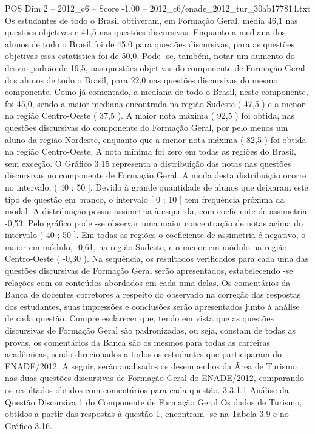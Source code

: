\begin{textsample}{POS Dim 2 – 2012\_c6 – Score -1.00 – 2012\_c6/enade\_2012\_tur\_30ab177814.txt}
Os estudantes de todo o Brasil obtiveram, em Formação Geral, média 46,1 nas questões objetivas e 41,5 nas questões discursivas.
Enquanto a mediana dos alunos de todo o Brasil foi de 45,0 para questões discursivas, para as questões objetivas essa estatística foi de 50,0.
Pode -se, também, notar um aumento do desvio padrão de 19,5, nas questões objetivas do componente de Formação Geral dos alunos de todo o Brasil, para 22,0 nas questões discursivas do mesmo componente.
Como já comentado, a mediana de todo o Brasil, neste componente, foi 45,0, sendo a maior mediana encontrada na região Sudeste ( 47,5 ) e a menor na região Centro-Oeste ( 37,5 ).
A maior nota máxima ( 92,5 ) foi obtida, nas questões discursivas do componente do Formação Geral, por pelo menos um aluno da região Nordeste, enquanto que a menor nota máxima ( 82,5 ) foi obtida na região Centro-Oeste.
A nota mínima foi zero em todas as regiões do Brasil, sem exceção.
O Gráfico 3.15 representa a distribuição das notas nas questões discursivas no componente de Formação Geral.
A moda desta distribuição ocorre no intervalo, ( 40 ; 50 ].
Devido à grande quantidade de alunos que deixaram este tipo de questão em branco, o intervalo [ 0 ; 10 ] tem frequência próxima da modal.
A distribuição possui assimetria à esquerda, com coeficiente de assimetria -0,53.
Pelo gráfico pode -se observar uma maior concentração de notas acima do intervalo ( 40 ; 50 ].
Em todas as regiões o coeficiente de assimetria é negativo, o maior em módulo, -0,61, na região Sudeste, e o menor em módulo na região Centro-Oeste ( -0,30 ).
Na sequência, os resultados verificados para cada uma das questões discursivas de Formação Geral serão apresentados, estabelecendo -se relações com os conteúdos abordados em cada uma delas.
Os comentários da Banca de docentes corretores a respeito do observado na correção das respostas dos estudantes, suas impressões e conclusões serão apresentados junto à análise de cada questão.
Cumpre esclarecer que, tendo em vista que as questões discursivas de Formação Geral são padronizadas, ou seja, constam de todas as provas, os comentários da Banca são os mesmos para todas as carreiras acadêmicas, sendo direcionados a todos os estudantes que participaram do ENADE/2012.
A seguir, serão analisados os desempenhos da Área de Turismo nas duas questões discursivas de Formação Geral do ENADE/2012, comparando os resultados obtidos com comentários para cada questão. 3.3.1.1 Análise da Questão Discursiva 1 do Componente de Formação Geral Os dados de Turismo, obtidos a partir das respostas à questão 1, encontram -se na Tabela 3.9 e no Gráfico 3.16.

\end{textsample}
